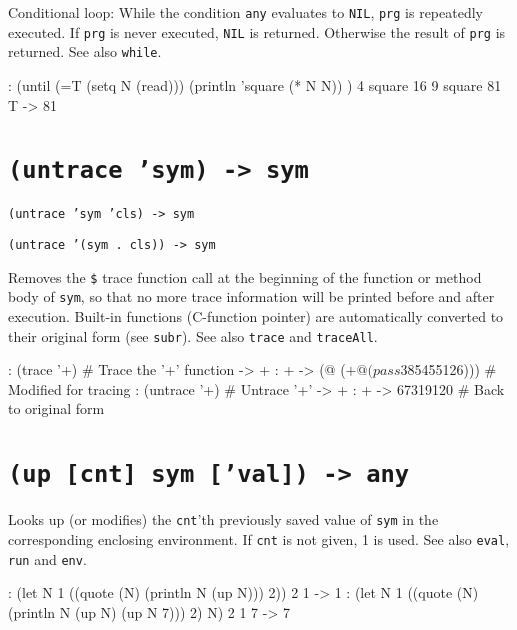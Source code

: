 Conditional loop: While the condition \texttt{any} evaluates to \texttt{NIL}, \texttt{prg} is
repeatedly executed. If \texttt{prg} is never executed, \texttt{NIL} is returned.
Otherwise the result of \texttt{prg} is returned. See also \texttt{while}.


\begin{wideverbatim}
: (until (=T (setq N (read)))
   (println 'square (* N N)) )
4
square 16
9
square 81
T
-> 81
\end{wideverbatim}

 
\section*{\texttt{(untrace 'sym) -> sym}}
\label{sec:func-ref-U-(untrace 'sym) -> sym}


\texttt{(untrace 'sym 'cls) -> sym}

\texttt{(untrace '(sym . cls)) -> sym}

Removes the \texttt{\$} trace function call at the beginning of the function or
method body of \texttt{sym}, so that no more trace information will be printed
before and after execution. Built-in functions (C-function pointer) are
automatically converted to their original form (see \texttt{subr}). See also
\texttt{trace} and \texttt{traceAll}.


\begin{wideverbatim}
: (trace '+)                           # Trace the '+' function
-> +
: +
-> (@ ($ + @ (pass $385455126)))       # Modified for tracing
: (untrace '+)                         # Untrace '+'
-> +
: +
-> 67319120                            # Back to original form
\end{wideverbatim}

 
\section*{\texttt{(up [cnt] sym ['val]) -> any}}
\label{sec:func-ref-U-(up [cnt] sym ['val]) -> any}


Looks up (or modifies) the \texttt{cnt}'th previously saved value of \texttt{sym} in
the corresponding enclosing environment. If \texttt{cnt} is not given, 1 is
used. See also \texttt{eval}, \texttt{run} and \texttt{env}.


\begin{wideverbatim}
: (let N 1 ((quote (N) (println N (up N))) 2))
2 1
-> 1
: (let N 1 ((quote (N) (println N (up N) (up N 7))) 2) N)
2 1 7
-> 7
\end{wideverbatim}

